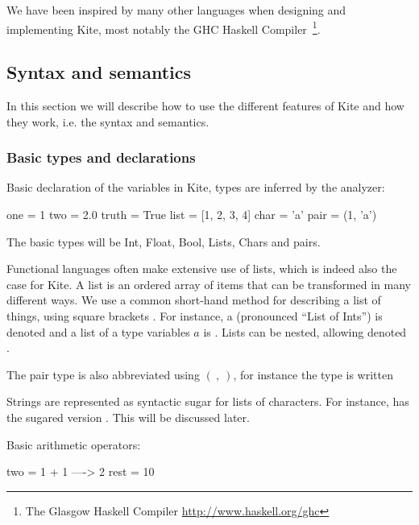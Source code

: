 We have been inspired by many other languages when designing and implementing Kite, most notably the GHC Haskell Compiler~\footnote{The Glasgow Haskell Compiler \url{http://www.haskell.org/ghc}}.


\subsection{Syntax and semantics}
In this section we will describe how to use the different features of Kite and how they work, i.e. the syntax and semantics.

\subsubsection{Basic types and declarations}
Basic declaration of the variables in Kite, types are inferred by the analyzer:

\begin{kite}
one = 1
two = 2.0
truth = True
list = [1, 2, 3, 4]
char = 'a'
pair = (1, 'a')
\end{kite}

The basic types will be Int, Float, Bool, Lists, Chars and pairs.

Functional languages often make extensive use of lists, which is
indeed also the case for Kite. A list is an ordered array of items
that can be transformed in many different ways. We use a common
short-hand method for describing a list of things, using square
brackets \code{[\ ]}. For instance, a  (pronounced ``List of
Ints'') is denoted \code{[Int]} and a list of a type variables $a$ is
\code{[a]}. Lists can be nested, allowing  denoted \code{[[Int]]}.

The pair type is also abbreviated using $(\ ,\ )$, for instance the type  is written 

Strings are represented as syntactic sugar for lists of characters. For
instance, \code{['f', 'o', 'o']} has the sugared version . This will be discussed later.

Basic arithmetic operators:
\begin{kite}
two = 1 + 1  ---->  2
rest = 10 %
\end{kite}

